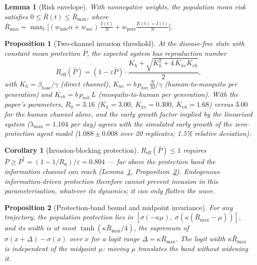 \documentclass[]{interact}
\newtheorem{lemma}{Lemma}
\newtheorem{proposition}{Proposition}
\newtheorem{corollary}{Corollary}
\begin{document}
\begin{lemma}[Risk envelope]\label{lem:envelope}
With nonnegative weights, the population mean risk satisfies $0 \le \bar{R}(t) \le \bar{R}_{\max}$, where $\bar{R}_{\max} = \max_t \big[(w_{\mathrm{info}}\alpha + w_{\mathrm{soc}})\,\tfrac{I(t)}{N} + w_{\mathrm{pers}}\tfrac{E(t)+I(t)}{N}\big]$.
\end{lemma}

\begin{proposition}[Two-channel invasion threshold]\label{prop:threshold}
At the disease-free state with constant mean protection $\bar{P}$, the expected system has reproduction number
\begin{equation}
R_{\mathrm{eff}}(\bar{P}) = (1-\varepsilon \bar{P}) \cdot \frac{K_h + \sqrt{K_h^2 + 4\,K_{hv} K_{vh}}}{2},
\label{eq:reff}
\end{equation}
with $K_h = \beta_{\mathrm{base}}/\gamma$ (direct channel), $K_{hv} = b\,p_{hm}\,\tfrac{N}{M}\big/\gamma$ (human-to-mosquito per generation) and $K_{vh} = b\,p_{mh}\,L$ (mosquito-to-human per generation). With the paper's parameters, $R_0 = 3.16$ ($K_h{=}3.00$, $K_{hv}{=}0.300$, $K_{vh}{=}1.68$) versus $3.00$ for the human channel alone, and the early growth factor implied by the linearised system ($\lambda_{\max} = 1.104$ per day) agrees with the simulated early growth of the zero-protection agent model ($1.088 \pm 0.008$ over 20 replicates; 1.5\% relative deviation).
\end{proposition}

\begin{corollary}[Invasion-blocking protection]\label{cor:block}
$R_{\mathrm{eff}}(\bar{P}) \le 1$ requires $\bar{P} \ge \bar{P}^{\dagger} = (1-1/R_0)/\varepsilon = 0.804$ --- far above the protection band the information channel can reach (Lemma~\ref{lem:envelope}, Proposition~\ref{prop:band}). Endogenous information-driven protection therefore cannot prevent invasion in this parameterisation, whatever its dynamics; it can only flatten the wave.
\end{corollary}

\begin{proposition}[Protection-band bound and midpoint invariance]\label{prop:band}
For any trajectory, the population protection lies in $[\sigma(-\kappa\mu),\; \sigma(\kappa(\bar{R}_{\max}-\mu))]$, and its width is at most $\tanh(\kappa \bar{R}_{\max}/4)$, the supremum of $\sigma(x+\Delta)-\sigma(x)$ over $x$ for a logit range $\Delta = \kappa\bar{R}_{\max}$. The logit width $\kappa\bar{R}_{\max}$ is \emph{independent of the midpoint} $\mu$: moving $\mu$ translates the band without widening it.
\end{proposition}
\end{document}

